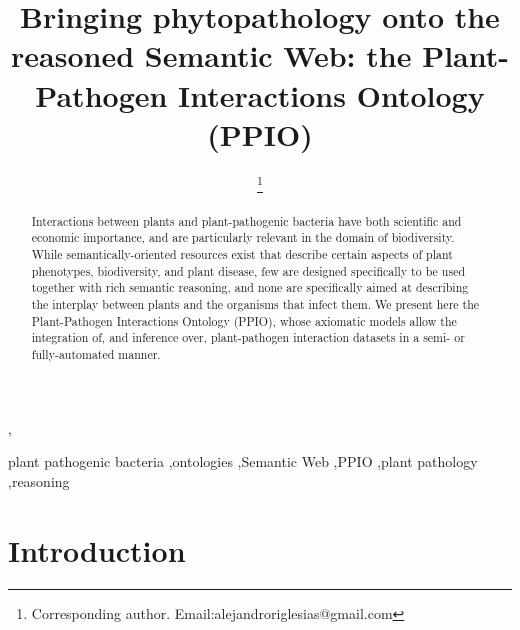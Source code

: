 \documentclass[sw]{iosart2c}
\begin{document}
\begin{frontmatter}

\title{Bringing phytopathology onto the reasoned Semantic Web: the Plant-Pathogen Interactions Ontology (PPIO)}
\runningtitle{}




\author[A]{ \thanks{Corresponding author. Email:alejandroriglesias@gmail.com}},
\author[A]{ }
\author[A]{ }
\author[A]{ }
\runningauthor{}
\address[A]{Biological Informatics Group, Centre for Plant Biotechnology and Genomics (CBGP), Technical University of Madrid (UPM), Spain}

\begin{abstract}
Interactions between plants and plant-pathogenic bacteria have both scientific and economic importance, and are particularly relevant in the domain of biodiversity. While semantically-oriented resources exist that describe certain aspects of plant phenotypes, biodiversity, and plant disease, few are designed specifically to be used together with rich semantic reasoning, and none are specifically aimed at describing the interplay between plants and the organisms that infect them.  We present here the Plant-Pathogen Interactions Ontology (PPIO), whose axiomatic models allow the integration of, and inference over, plant-pathogen interaction datasets in a semi- or fully-automated manner.
\end{abstract}

\begin{keyword}
 plant pathogenic bacteria \sep ontologies \sep Semantic Web \sep PPIO \sep plant pathology \sep reasoning
\end{keyword}

\end{frontmatter}


\section{Introduction}\label{s1}
\end{document}

